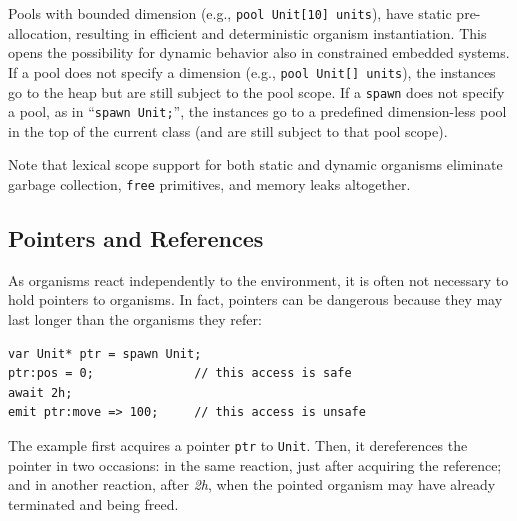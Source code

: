 \documentclass{acm_proc_article-sp}
\newcommand{\code}[1] {{\small{\texttt{#1}}}}
\newcommand{\1}{\;}
\newcommand{\2}{\;\;}
\newcommand{\3}{\;\;\;}
\newcommand{\5}{\;\;\;\;\;}
\begin{document}
Pools with bounded dimension (e.g., \code{pool Unit[10] units}), have static 
pre-allocation, resulting in efficient and deterministic organism 
instantiation.
This opens the possibility for dynamic behavior also in constrained embedded 
systems.
%
If a pool does not specify a dimension (e.g., \code{pool Unit[] units}), the 
instances go to the heap but are still subject to the pool scope.
%
If a \code{spawn} does not specify a pool, as in ``\code{spawn Unit;}'', the 
instances go to a predefined dimension-less pool in the top of the current 
class (and are still subject to that pool scope).

Note that lexical scope support for both static and dynamic organisms eliminate 
garbage collection, \code{free} primitives, and memory leaks altogether.

\subsection{Pointers and References}
\label{sec.orgs.refs}

As organisms react independently to the environment, it is often not necessary 
to hold pointers to organisms.
%
In fact, pointers can be dangerous because they may last longer than the 
organisms they refer:

\begin{lstlisting}
var Unit* ptr = spawn Unit;
ptr:pos = 0;              // this access is safe
await 2h;
emit ptr:move => 100;     // this access is unsafe
\end{lstlisting}

The example first acquires a pointer \code{ptr} to \code{Unit}.
Then, it dereferences the pointer in two occasions:
in the same reaction, just after acquiring the reference;
and in another reaction, after \emph{2h}, when the pointed organism may have 
already terminated and being freed.
\end{document}
